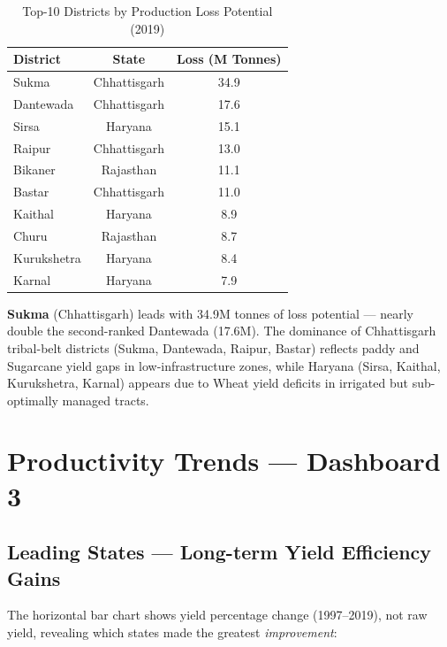 \documentclass[10pt]{article}
\begin{document}
\begin{table}[H]
  \centering
  \caption{Top-10 Districts by Production Loss Potential (2019)}
  \label{tab:loss}
  \small
  \begin{tabular}{lcc}
    \toprule
    \textbf{District} & \textbf{State} & \textbf{Loss (M Tonnes)} \\
    \midrule
    Sukma         & Chhattisgarh      & 34.9 \\
    Dantewada     & Chhattisgarh      & 17.6 \\
    Sirsa         & Haryana           & 15.1 \\
    Raipur        & Chhattisgarh      & 13.0 \\
    Bikaner       & Rajasthan         & 11.1 \\
    Bastar        & Chhattisgarh      & 11.0 \\
    Kaithal       & Haryana           &  8.9 \\
    Churu         & Rajasthan         &  8.7 \\
    Kurukshetra   & Haryana           &  8.4 \\
    Karnal        & Haryana           &  7.9 \\
    \bottomrule
  \end{tabular}
\end{table}

\textbf{Sukma} (Chhattisgarh) leads with 34.9M tonnes of loss potential —
nearly double the second-ranked Dantewada (17.6M). The dominance of
Chhattisgarh tribal-belt districts (Sukma, Dantewada, Raipur, Bastar) reflects
paddy and Sugarcane yield gaps in low-infrastructure zones, while Haryana
(Sirsa, Kaithal, Kurukshetra, Karnal) appears due to Wheat yield deficits
in irrigated but sub-optimally managed tracts.

\section{Productivity Trends — Dashboard 3}

\subsection{Leading States — Long-term Yield Efficiency Gains}
The horizontal bar chart shows yield percentage change (1997–2019), not raw
yield, revealing which states made the greatest \emph{improvement}:
\end{document}
